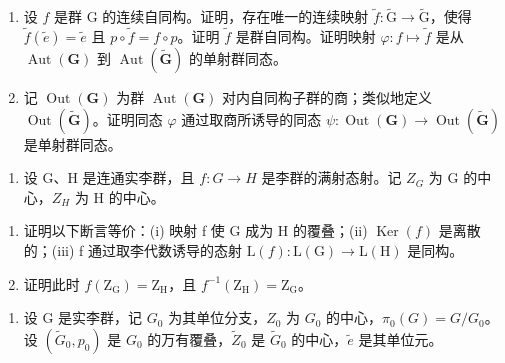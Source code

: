 \begin{enumerate}
\def\labelenumi{\alph{enumi})}
\item
  设 \(f\) 是群 G 的连续自同构。证明，存在唯一的连续映射 \(\widetilde{f} \colon \widetilde{\mathrm{G}} \to \widetilde{\mathrm{G}}\)，使得 \(\widetilde{f}(\widetilde{e}) = \widetilde{e}\) 且 \(p \circ \widetilde{f} = f \circ p\)。证明 \(\widetilde{f}\) 是群自同构。证明映射 \(\varphi \colon f \mapsto \widetilde{f}\) 是从 \(\operatorname{Aut}(\mathbf{G})\) 到 \(\operatorname{Aut}(\widetilde{\mathbf{G}})\) 的单射群同态。
\item
  记 \(\operatorname{Out}(\mathbf{G})\) 为群 \(\operatorname{Aut}(\mathbf{G})\) 对内自同构子群的商；类似地定义 \(\operatorname{Out}(\widetilde{\mathbf{G}})\)。证明同态 \(\varphi\) 通过取商所诱导的同态 \(\psi\colon\operatorname{Out}(\mathbf{G})\to\operatorname{Out}(\widetilde{\mathbf{G}})\) 是单射群同态。
\end{enumerate}

\begin{enumerate}
\def\labelenumi{\arabic{enumi})}
\setcounter{enumi}{5}
\tightlist
\item
  设 G、H 是连通实李群，且 \(f: G \to H\) 是李群的满射态射。记 \(Z_{G}\) 为 G 的中心，\(Z_{H}\) 为 H 的中心。
\end{enumerate}

\begin{enumerate}
\def\labelenumi{\alph{enumi})}
\item
  证明以下断言等价：(i) 映射 f 使 G 成为 H 的覆叠；(ii) \(\operatorname{Ker}(f)\) 是离散的；(iii) f 通过取李代数诱导的态射 \(\mathrm{L}(f)\colon\mathrm{L}(\mathrm{G})\to\mathrm{L}(\mathrm{H})\) 是同构。
\item
  证明此时 \(f(\mathrm{Z}_{\mathrm{G}})=\mathrm{Z}_{\mathrm{H}}\)，且 \(f^{-1}(\mathrm{Z}_{\mathrm{H}})=\mathrm{Z}_{\mathrm{G}}\)。
\end{enumerate}

\begin{enumerate}
\def\labelenumi{\arabic{enumi})}
\setcounter{enumi}{6}
\tightlist
\item
  设 G 是实李群，记 \(G_{0}\) 为其单位分支，\(Z_{0}\) 为 \(G_{0}\) 的中心，\(\pi_{0}(G)=G/G_{0}\)。设 \((\widetilde{G}_{0},p_{0})\) 是 \(G_{0}\) 的万有覆叠，\(\widetilde{Z}_{0}\) 是 \(\widetilde{G}_{0}\) 的中心，\(\widetilde{e}\) 是其单位元。
\end{enumerate}

